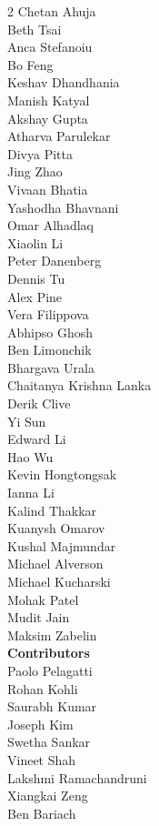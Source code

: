 \begin{multicols}{2}
Chetan Ahuja \\
Beth Tsai \\
Anca Stefanoiu \\
Bo Feng \\
Keshav Dhandhania \\
Manish Katyal \\
Akshay Gupta \\
Atharva Parulekar \\
Divya Pitta \\
Jing Zhao \\
Vivaan Bhatia \\
Yashodha Bhavnani \\
Omar Alhadlaq \\
Xiaolin Li \\
Peter Danenberg \\
Dennis Tu \\
Alex Pine \\
Vera Filippova \\
Abhipso Ghosh \\
Ben Limonchik \\
Bhargava Urala \\
Chaitanya Krishna Lanka \\
Derik Clive \\
Yi Sun \\
Edward Li \\
Hao Wu \\
Kevin Hongtongsak \\
Ianna Li \\
Kalind Thakkar \\
Kuanysh Omarov \\
Kushal Majmundar \\
Michael Alverson \\
Michael Kucharski \\
Mohak Patel \\
Mudit Jain \\
Maksim Zabelin \\
\textbf{Contributors} \\
Paolo Pelagatti \\
Rohan Kohli \\
Saurabh Kumar \\
Joseph Kim \\
Swetha Sankar \\
Vineet Shah \\
Lakshmi Ramachandruni \\
Xiangkai Zeng \\
Ben Bariach \\

\end{multicols}
